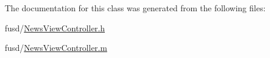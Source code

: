 \-The documentation for this class was generated from the following files\-:\begin{DoxyCompactItemize}
\item 
fusd/\hyperlink{_news_view_controller_8h}{\-News\-View\-Controller.\-h}\item 
fusd/\hyperlink{_news_view_controller_8m}{\-News\-View\-Controller.\-m}\end{DoxyCompactItemize}
